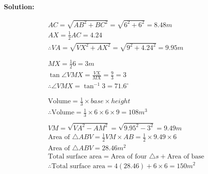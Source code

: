 \documentclass{article}
\begin{document}

{\scriptsize \textbf{Solution:}}

\[
  \begin{aligned}
    AC = \sqrt{AB^{2}+BC^{2}} = \sqrt{6^{2}+6^{2}} = 8.48m \\
    AX = \frac{1}{2}AC = 4.24 \\
    \therefore VA = \sqrt{VX^{2}+AX^{2}} = \sqrt{9^{2}+4.24^{2}} = 9.95m \\
    \\
    \\
    MX = \frac{1}{2}6 = 3m \\
    \tan \angle VMX = \frac{VX}{MX} = \frac{9}{3} = 3 \\
    \therefore \angle VMX = \tan^{-1}3 = 71.6^{\circ} \\
    \\
    \\
    \text{Volume} = \frac{1}{3} \times base \times height \\
    \therefore \text{Volume} = \frac{1}{3} \times 6 \times 6 \times 9 = 108m^{3}
    \\
    \\
    VM = \sqrt{VA^{2}-AM^{2}} = \sqrt{9.95^{2}-3^{2}} = 9.49m \\
    \text{Area of } \triangle ABV = \frac{1}{2}VM \times AB = \frac{1}{2} \times 9.49 \times 6 \\
    \text{Area of } \triangle ABV = 28.46m^{2} \\
    \text{Total surface area} = \text{Area of four } \triangle s + \text{Area of base} \\
    \therefore \text{Total surface area} = 4(28.46) + 6 \times 6 = 150m^{2}
  \end{aligned}
\]
\end{document}
